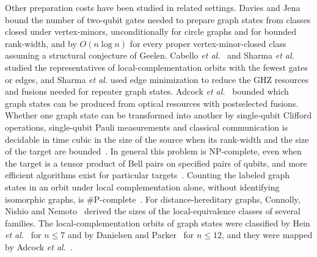 \documentclass[aps,pra,onecolumn,superscriptaddress,nofootinbib,longbibliography]{revtex4-2}
\theoremstyle{plain}
\theoremstyle{remark}
\begin{document}
Other preparation costs have been studied in related settings. Davies and Jena~\cite{Davies2025preparing}
bound the number of two-qubit gates needed to prepare graph states from classes closed under
vertex-minors, unconditionally for circle graphs and for bounded rank-width, and by $O(n\log n)$ for every
proper vertex-minor-closed class assuming a structural conjecture of Geelen. Cabello
\emph{et al.}~\cite{Cabello2011optimal} and Sharma \emph{et al.}~\cite{Sharma2026minimising} studied the
representatives of local-complementation orbits with the fewest gates or edges, and Sharma \emph{et al.}
used edge minimization to reduce the GHZ resources and fusions needed for repeater graph states. Adcock
\emph{et al.}~\cite{Adcock2019hard} bounded which graph states can be produced from optical resources
with postselected fusions. Whether one graph state can be transformed into another by single-qubit
Clifford operations, single-qubit Pauli measurements and classical communication is decidable in time
cubic in the size of the source when its rank-width and the size of the target are
bounded~\cite{Dahlberg2018transforming}. In general this problem is NP-complete, even when the target is a
tensor product of Bell pairs on specified pairs of qubits, and more efficient algorithms exist for
particular targets~\cite{Dahlberg2020how,Dahlberg2020transforming}. Counting the labeled graph states in
an orbit under local complementation alone, without identifying isomorphic graphs, is
\#P-complete~\cite{Dahlberg2020counting}. For distance-hereditary graphs, Connolly, Nishio and
Nemoto~\cite{Connolly2026local} derived the sizes of the local-equivalence classes of several families.
The local-complementation orbits of graph states were classified by Hein
\emph{et al.}~\cite{Hein2004multiparty} for $n\le 7$ and by Danielsen and
Parker~\cite{Danielsen2006classification} for $n\le 12$, and they were mapped by Adcock
\emph{et al.}~\cite{Adcock2020mapping}.
\end{document}
